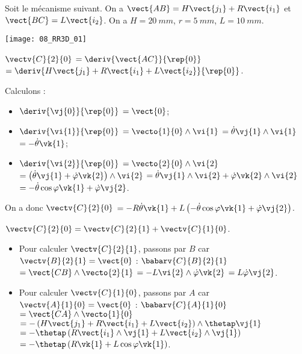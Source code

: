 \normalfalse \difficiletrue \tdifficilefalse
\correctiontrue


\setcounter{question}{0}%
\ifcorrection
\else
{}
\fi

\ifprof
\else
Soit le mécanisme suivant. On a $\vect{AB}=H\vect{j_1}+R\vect{i_1}$ et $\vect{BC}=L\vect{i_2}$. On a $H=\SI{20}{mm}$, $r=\SI{5}{mm}$, $L=\SI{10}{mm}$. 
\begin{marginfigure}
\texttt{[image: 08\_RR3D\_01]}
\end{marginfigure}
\fi

\ifprof
$\vectv{C}{2}{0}$ 
$=\deriv{\vect{AC}}{\rep{0}}$
$=\deriv{H\vect{j_1}+R\vect{i_1}+L\vect{i_2}}{\rep{0}}$.

Calculons : 
\begin{itemize}
\item $\deriv{\vj{0}}{\rep{0}}$ $=\vect{0}$;
\item $\deriv{\vi{1}}{\rep{0}}$ $=\vecto{1}{0} \wedge \vi{1}$ $=\dot{\theta}\vj{1} \wedge \vi{1}$ $=-\dot{\theta}\vk{1}$;
\item $\deriv{\vi{2}}{\rep{0}}$ $=\vecto{2}{0} \wedge \vi{2}$ 
$=\left(\dot{\theta}\vj{1} + \dot{\varphi}\vk{2}\right)\wedge \vi{2}$
$=\dot{\theta}\vj{1}\wedge \vi{2} + \dot{\varphi}\vk{2}\wedge \vi{2}$
$=-\dot{\theta}\cos\varphi\vk{1} + \dot{\varphi}\vj{2}$.
\end{itemize}

On a donc 
$\vectv{C}{2}{0}$ 
$= -R\dot{\theta}\vk{1}+L\left(-\dot{\theta}\cos\varphi\vk{1} + \dot{\varphi}\vj{2}\right)$.


\else
\fi

\ifprof
$\vectv{C}{2}{0}=\vectv{C}{2}{1}+\vectv{C}{1}{0}$.

\begin{itemize}
\item Pour calculer $\vectv{C}{2}{1}$, passons par $B$ car $\vectv{B}{2}{1}=\vect{0}$ :
$\babarv{C}{B}{2}{1}$
$ = \vect{CB}\wedge\vecto{2}{1}$
$ = -L\vi{2}\wedge\dot{\varphi}\vk{2}$
$ = L\dot{\varphi}\vj{2}$.
\item Pour calculer $\vectv{C}{1}{0}$, passons par $A$ car $\vectv{A}{1}{0}=\vect{0}$ :
$\babarv{C}{A}{1}{0}$
$ = \vect{CA}\wedge\vecto{1}{0}$
$ = -\left( H\vect{j_1}+R\vect{i_1}+L\vect{i_2}\right)\wedge\thetap\vj{1}$
$ = -\thetap\left( R\vect{i_1}\wedge\vj{1}+L\vect{i_2}\wedge\vj{1}\right)$
$ = -\thetap\left( R\vk{1}+L\cos\varphi\vk{1}\right)$.
\end{itemize}

